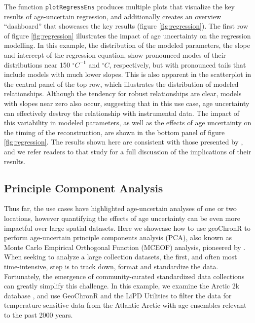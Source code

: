 \documentclass[gchron, manuscript]{copernicus}
\begin{document}
The function \texttt{plotRegressEns} produces multiple plots that visualize the key results of age-uncertain regression, and additionally creates an overview ``dashboard'' that showcases the key results (figure \ref{fig:regression}).
The first row of figure \ref{fig:regression} illustrates the impact of age uncertainty on the regression modelling.
In this example, the distribution of the modeled parameters, the slope and intercept of the regression equation, show pronounced modes of their distributions near 150 \(^\circ C^{-1}\) and \(^\circ C\), respectively, but with pronounced tails that include models with much lower slopes.
This is also apparent in the scatterplot in the central panel of the top row, which illustrates the distribution of modeled relationships.
Although the tendency for robust relationships are clear, models with slopes near zero also occur, suggesting that in this use case, age uncertainty can effectively destroy the relationship with instrumental data.
The impact of this variability in modeled parameters, as well as the effects of age uncertainty on the timing of the reconstruction, are shown in the bottom panel of figure \ref{fig:regression}.
The results shown here are consistent with those presented by \citet{Boldt:2015}, and we refer readers to that study for a full discussion of the implications of their results.

\hypertarget{sec:pca}{%
\subsection{Principle Component Analysis}\label{sec:pca}}

Thus far, the use cases have highlighted age-uncertain analyses of one or two locations, however quantifying the effects of age uncertainty can be even more impactful over large spatial datasets.
Here we showcase how to use geoChronR to perform age-uncertain principle components analysis (PCA), also known as Monte Carlo Empirical Orthogonal Function (MCEOF) analysis, pioneered by \citet{anchukaitis2013mceof}.
When seeking to analyze a large collection datasets, the first, and often most time-intensive, step is to track down, format and standardize the data.
Fortunately, the emergence of community-curated standardized data collections \citep[e.g.][\citet{Pages2017}, \citet{Temp12k}]{Pages2013} can greatly simplify this challenge.
In this example, we examine the Arctic 2k database \citep{McKayKaufman2014}, and use GeoChronR and the LiPD Utilities to filter the data for temperature-sensitive data from the Atlantic Arctic with age ensembles relevant to the past 2000 years.
\end{document}
